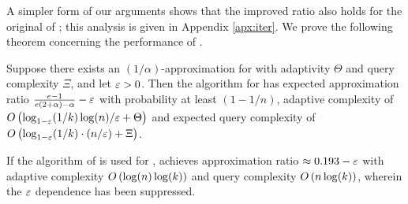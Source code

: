 A simpler form of our arguments shows that
the improved ratio also holds for the original
\iter of ; this analysis is 
given in Appendix
\ref{apx:iter}. 
We prove the following theorem concerning the performance of \latg.
\begin{theorem} \label{thm:latg}
  Suppose there exists an $(1/\alpha)$-approximation for
  \unc with adaptivity $\Theta$ and query complexity
  $\Xi$, and let $\varepsilon> 0$.
  Then the algorithm \algTwofullname  for \sm
  has expected approximation ratio
  $\frac{e-1}{e(2+\alpha)-\alpha}-\varepsilon$ %
  with probability at
  least $(1 - 1/n)$,
  adaptive complexity of
  $O\left( \log_{1 - \varepsilon} (1/k) \log( n) / \varepsilon + \Theta \right)$ 
  and expected query complexity
  of
  $O \left( \log_{1 - \varepsilon}(1/k) \cdot \left( n / \varepsilon \right) + \Xi \right)$.
\end{theorem}
  If the algorithm of  is used for \unc,
\latg achieves approximation
  ratio $\approx 0.193 - \varepsilon$
  with adaptive complexity
  $O\left( \log(n)\log( k ) \right)$
  and query complexity
  $O\left( n \log(k)  \right)$, wherein the $\varepsilon$
  dependence has been suppressed.
